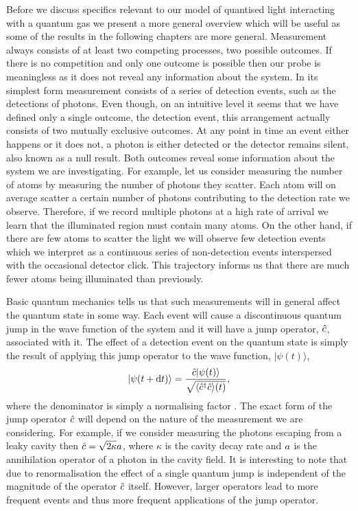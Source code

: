 Before we discuss specifics relevant to our model of quantised light
interacting with a quantum gas we present a more general overview
which will be useful as some of the results in the following chapters
are more general. Measurement always consists of at least two
competing processes, two possible outcomes. If there is no competition
and only one outcome is possible then our probe is meaningless as it
does not reveal any information about the system. In its simplest form
measurement consists of a series of detection events, such as the
detections of photons. Even though, on an intuitive level it seems
that we have defined only a single outcome, the detection event, this
arrangement actually consists of two mutually exclusive outcomes. At
any point in time an event either happens or it does not, a photon is
either detected or the detector remains silent, also known as a null
result. Both outcomes reveal some information about the system we are
investigating. For example, let us consider measuring the number of
atoms by measuring the number of photons they scatter. Each atom will
on average scatter a certain number of photons contributing to the
detection rate we observe. Therefore, if we record multiple photons at
a high rate of arrival we learn that the illuminated region must
contain many atoms. On the other hand, if there are few atoms to
scatter the light we will observe few detection events which we
interpret as a continuous series of non-detection events interspersed
with the occasional detector click. This trajectory informs us that
there are much fewer atoms being illuminated than previously.

Basic quantum mechanics tells us that such measurements will in
general affect the quantum state in some way. Each event will cause a
discontinuous quantum jump in the wave function of the system and it
will have a jump operator, $\hat{c}$, associated with it. The effect of a
detection event on the quantum state is simply the result of applying
this jump operator to the wave function, $| \psi (t) \rangle$,
\begin{equation}
  \label{eq:jump}
  | \psi(t + \mathrm{d}t) \rangle = \frac{\hat{c} | \psi(t) \rangle}
  {\sqrt{\langle \hat{c}^\dagger \hat{c} \rangle (t)}},
\end{equation}
where the denominator is simply a normalising factor
\cite{MeasurementControl}. The exact form of the jump operator $\hat{c}$
will depend on the nature of the measurement we are considering. For
example, if we consider measuring the photons escaping from a leaky
cavity then $\hat{c} = \sqrt{2 \kappa} a$, where $\kappa$ is the
cavity decay rate and $a$ is the annihilation operator of a
photon in the cavity field. It is interesting to note that due to
renormalisation the effect of a single quantum jump is independent of
the magnitude of the operator $\hat{c}$ itself. However, larger operators
lead to more frequent events and thus more frequent applications of
the jump operator.

